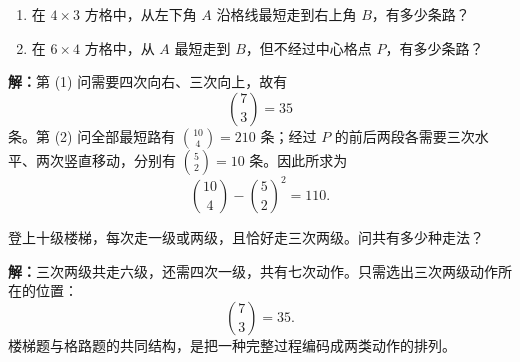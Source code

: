 \begin{examplebox}
  \begin{enumerate}
    \item 在 $4\times3$ 方格中，从左下角 $A$ 沿格线最短走到右上角 $B$，有多少条路？
    \item 在 $6\times4$ 方格中，从 $A$ 最短走到 $B$，但不经过中心格点 $P$，有多少条路？
  \end{enumerate}

  \begin{center}
  \end{center}

  \textbf{解：}第 (1) 问需要四次向右、三次向上，故有
  \[
    \binom73=35
  \]
  条。第 (2) 问全部最短路有 $\binom{10}{4}=210$ 条；经过 $P$ 的前后两段各需要三次水平、两次竖直移动，分别有 $\binom52=10$ 条。因此所求为
  \[
    \binom{10}{4}-\binom52^2=110.
  \]
\end{examplebox}

\begin{examplebox}
  登上十级楼梯，每次走一级或两级，且恰好走三次两级。问共有多少种走法？

  \textbf{解：}三次两级共走六级，还需四次一级，共有七次动作。只需选出三次两级动作所在的位置：
  \[
    \binom73=35.
  \]
  楼梯题与格路题的共同结构，是把一种完整过程编码成两类动作的排列。
\end{examplebox}

